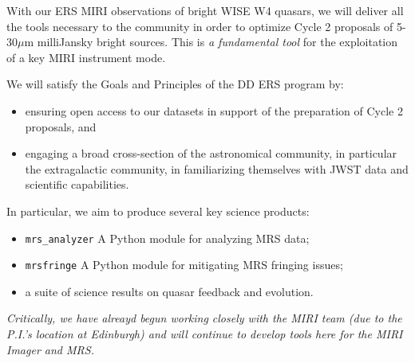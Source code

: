 With our ERS MIRI observations of bright WISE W4 quasars, we will deliver all the tools necessary to the community in order to optimize Cycle 2 proposals of 5-30$\mu$m milliJansky bright sources. This is {\it a fundamental tool} for the exploitation of a key MIRI instrument mode.

\noindent
We will satisfy the Goals and Principles of the DD ERS program by:
\begin{itemize}
\item ensuring open access to our datasets in support of the preparation of Cycle 2 proposals, and
\item engaging a broad cross-section of the astronomical community, in particular the extragalactic community, in familiarizing themselves with JWST data and scientific capabilities.
\end{itemize}

\noindent
In particular, we aim to produce several key science products:
\begin{itemize}
\item {\tt mrs\_analyzer} A Python module for analyzing MRS data; 
\item {\tt mrsfringe} A Python module for mitigating MRS fringing issues; 
\item a suite of science results on quasar feedback and evolution. 
\end{itemize}

\noindent
{\it Critically, we have alreayd begun working closely with the MIRI team (due to the P.I.'s location at Edinburgh) and will continue to develop tools here for the MIRI Imager and MRS.}\\


